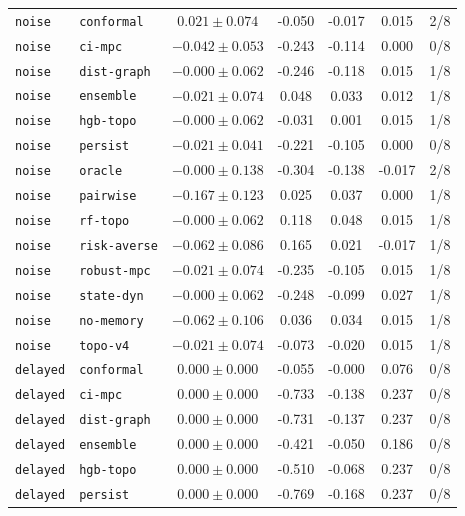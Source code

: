\documentclass{article}
\begin{document}
\begin{center}
\begin{tabular}{llccccc}
\texttt{noise} & \texttt{conformal} & $0.021 \pm 0.074$ & -0.050 & -0.017 & 0.015 & 2/8 \\
\texttt{noise} & \texttt{ci-mpc} & $-0.042 \pm 0.053$ & -0.243 & -0.114 & 0.000 & 0/8 \\
\texttt{noise} & \texttt{dist-graph} & $-0.000 \pm 0.062$ & -0.246 & -0.118 & 0.015 & 1/8 \\
\texttt{noise} & \texttt{ensemble} & $-0.021 \pm 0.074$ & 0.048 & 0.033 & 0.012 & 1/8 \\
\texttt{noise} & \texttt{hgb-topo} & $-0.000 \pm 0.062$ & -0.031 & 0.001 & 0.015 & 1/8 \\
\texttt{noise} & \texttt{persist} & $-0.021 \pm 0.041$ & -0.221 & -0.105 & 0.000 & 0/8 \\
\texttt{noise} & \texttt{oracle} & $-0.000 \pm 0.138$ & -0.304 & -0.138 & -0.017 & 2/8 \\
\texttt{noise} & \texttt{pairwise} & $-0.167 \pm 0.123$ & 0.025 & 0.037 & 0.000 & 1/8 \\
\texttt{noise} & \texttt{rf-topo} & $-0.000 \pm 0.062$ & 0.118 & 0.048 & 0.015 & 1/8 \\
\texttt{noise} & \texttt{risk-averse} & $-0.062 \pm 0.086$ & 0.165 & 0.021 & -0.017 & 1/8 \\
\texttt{noise} & \texttt{robust-mpc} & $-0.021 \pm 0.074$ & -0.235 & -0.105 & 0.015 & 1/8 \\
\texttt{noise} & \texttt{state-dyn} & $-0.000 \pm 0.062$ & -0.248 & -0.099 & 0.027 & 1/8 \\
\texttt{noise} & \texttt{no-memory} & $-0.062 \pm 0.106$ & 0.036 & 0.034 & 0.015 & 1/8 \\
\texttt{noise} & \texttt{topo-v4} & $-0.021 \pm 0.074$ & -0.073 & -0.020 & 0.015 & 1/8 \\
\texttt{delayed} & \texttt{conformal} & $0.000 \pm 0.000$ & -0.055 & -0.000 & 0.076 & 0/8 \\
\texttt{delayed} & \texttt{ci-mpc} & $0.000 \pm 0.000$ & -0.733 & -0.138 & 0.237 & 0/8 \\
\texttt{delayed} & \texttt{dist-graph} & $0.000 \pm 0.000$ & -0.731 & -0.137 & 0.237 & 0/8 \\
\texttt{delayed} & \texttt{ensemble} & $0.000 \pm 0.000$ & -0.421 & -0.050 & 0.186 & 0/8 \\
\texttt{delayed} & \texttt{hgb-topo} & $0.000 \pm 0.000$ & -0.510 & -0.068 & 0.237 & 0/8 \\
\texttt{delayed} & \texttt{persist} & $0.000 \pm 0.000$ & -0.769 & -0.168 & 0.237 & 0/8 \\
\bottomrule
\end{tabular}
\end{center}
\end{document}
